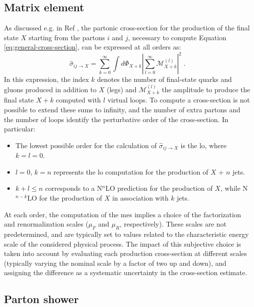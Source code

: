 \subsection{Matrix element}

As discussed e.g. in Ref \cite{Skands:2011pf}, the partonic cross-section for the production of the final state $X$ starting from the partons $i$ and $j$, necessary to compute
Equation \ref{eq:general-cross-section}, can be expressed at all orders as:
\begin{equation}
\hat\sigma_{ij\rightarrow X} = \sum_{k=0}^\infty \int d\Phi_{X+k} | \sum_{l=0}^\infty \mathcal{M}_{X+k}^{(l)}|^2 \; .
\label{eq:xsec_matrix}
\end{equation}
\noindent In this expression, the index $k$ denotes the number of final-state quarks and gluons produced in addition to $X$ (legs) and $\mathcal{M}_{X+k}^{(l)}$
the amplitude to produce the final state $X+k$ computed with $l$ virtual loops. To compute a cross-section is not possible to extend these sums to infinity, and the number of extra partons and the number of loops identify the 
perturbative order of the cross-section. In particular:
\begin{itemize}
\item The lowest possible order for the calculation of $\hat{\sigma}_{ij \rightarrow X}$ is the \gls{lo}, where $k=l=0$.
\item $l=0$, $k=n$ represents the \gls{lo} computation for the production of $X$ + $n$ jets.
\item $k+l \leq n$ corresponds to a N$^n$LO prediction for the production of $X$, while N$^{n-k}$LO for the production of $X$ in association with $k$ jets.
\end{itemize}

At each order, the computation of the \glspl{me} implies a choice of the factorization and renormalization scales 
($\mu_F$ and $\mu_R$, respectively). 
These scales are not predetermined, and are typically set to values related to the characteristic energy scale of the considered physical process. 
The impact of this subjective choice is taken into account by evaluating each production cross-section at different scales (typically varying the nominal scale by a factor of two up and down), and assigning the difference as a systematic uncertainty in the cross-section estimate.


\subsection{Parton shower}


